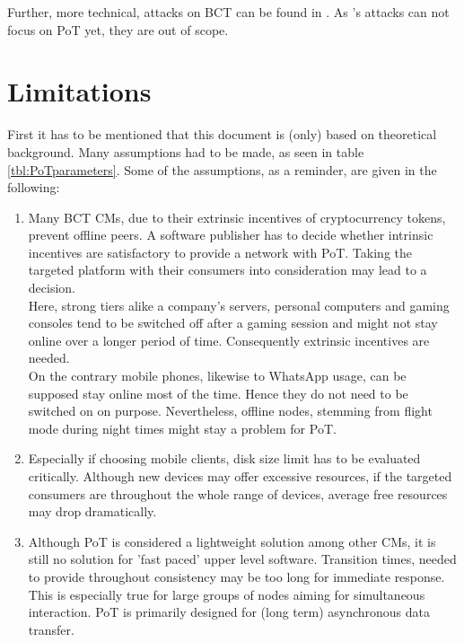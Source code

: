 \noindent Further, more technical, attacks on \gls{BCT} can be found in \cite{Min.2019b}.
As \citet{Min.2019b}'s attacks can not focus on \gls{PoT} yet, they are out of scope.



\section{Limitations}
\label{sec:Limitations}

First it has to be mentioned that this document is (only) based on theoretical background.
Many assumptions had to be made, as seen in table \ref{tbl:PoTparameters}.
Some of the assumptions, as a reminder, are given in the following:
\begin{enumerate}
	\item Many \gls{BCT} \gls{CM}s, due to their extrinsic incentives of cryptocurrency tokens, prevent offline peers.
	A software publisher has to decide whether intrinsic incentives are satisfactory to provide a network with \gls{PoT}.
	Taking the targeted platform with their consumers into consideration may lead to a decision. \\
	Here, strong tiers alike a company's servers, personal computers and gaming consoles tend to be switched off after a gaming session and might not stay online over a longer period of time.
	Consequently extrinsic incentives are needed. \\
	On the contrary mobile phones, likewise to WhatsApp usage, can be supposed stay online most of the time.
	Hence they do not need to be switched on on purpose.
	Nevertheless, offline nodes, stemming from flight mode during night times might stay a problem for \gls{PoT}.
	
	\item Especially if choosing mobile clients, disk size limit has to be evaluated critically.
	Although new devices may offer excessive resources,
	if the targeted consumers are throughout the whole range of devices, average free resources may drop dramatically.
	
	\item Although \gls{PoT} is considered a lightweight solution among other \gls{CM}s, it is still no solution for 'fast paced' upper level software.
	Transition times, needed to provide throughout consistency may be too long for immediate response.	
	This is especially true for large groups of nodes aiming for simultaneous interaction.
	\gls{PoT} is primarily designed for (long term) asynchronous data transfer.
	

\end{enumerate}

